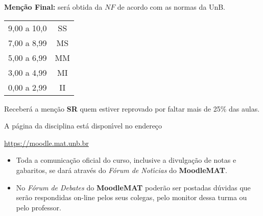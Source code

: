 \documentclass[12pt]{exam}
\begin{document}
\vspace{0.5cm}
{\bf \noindent Men\c{c}\~{a}o Final:} ser\'{a} obtida da $NF$ de
acordo com as normas da UnB.
\begin{center}
    \begin{tabular}{c|c}
        \hline\hline
        \hspace{1cm}{Nota}\hspace{1cm} & \hspace{0.25cm}{Men\c{c}\~{a}o}\hspace{0.25cm}\\
        \hline\hline
        9,00 a 10,0 & SS \\
        \hline
        7,00 a 8,99 & MS \\
        \hline
        5,00 a 6,99 & MM \\
        \hline
        3,00 a 4,99 & MI \\
        \hline
        0,00 a 2,99  & II \\
        \hline\hline
    \end{tabular}
\end{center}
Receber{\'a} a men{\c c}{\~a}o {\bf SR} quem estiver reprovado por faltar mais de 25\%
das aulas.

\vspace{0.5cm}
 A p\'agina da disciplina est\'a dispon{\'\i}vel no endere\c{c}o
\begin{center}
    \href{https://moodle.mat.unb.br/course/view.php?id=55}{https://moodle.mat.unb.br}
\end{center}


\begin{itemize}
\item Toda a comunica\c{c}\~{a}o oficial do curso, inclusive a divulga\c{c}\~{a}o de
notas e gabaritos, se dar\'{a} atrav\'{e}s do {\em F\'{o}rum de Not\'{\i}cias} do
\textbf{MoodleMAT}.
\item No {\em F\'{o}rum de Debates} do \textbf{MoodleMAT} poder\~{a}o ser
postadas d\'{u}vidas que ser\~{a}o respondidas on-line pelos seus
colegas, pelo monitor dessa turma ou pelo professor.
\end{itemize}

\end{document}
